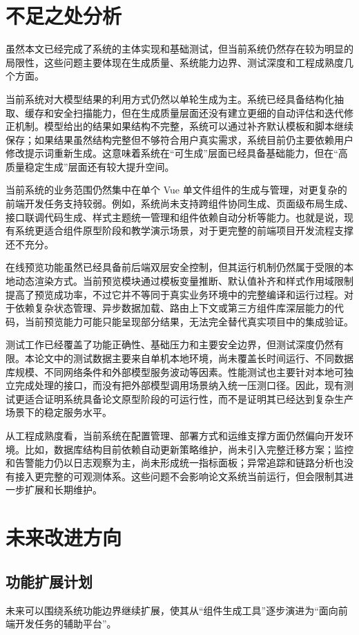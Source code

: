 \section{不足之处分析}
虽然本文已经完成了系统的主体实现和基础测试，但当前系统仍然存在较为明显的局限性，这些问题主要体现在生成质量、系统能力边界、测试深度和工程成熟度几个方面。

当前系统对大模型结果的利用方式仍然以单轮生成为主。系统已经具备结构化抽取、缓存和安全扫描能力，但在生成质量层面还没有建立更细的自动评估和迭代修正机制。模型给出的结果如果结构不完整，系统可以通过补齐默认模板和脚本继续保存；如果结果虽然结构完整但不够符合用户真实需求，系统目前仍主要依赖用户修改提示词重新生成。这意味着系统在“可生成”层面已经具备基础能力，但在“高质量稳定生成”层面还有较大提升空间。

当前系统的业务范围仍然集中在单个 Vue 单文件组件的生成与管理，对更复杂的前端开发任务支持较弱。例如，系统尚未支持跨组件协同生成、页面级布局生成、接口联调代码生成、样式主题统一管理和组件依赖自动分析等能力。也就是说，现有系统更适合组件原型阶段和教学演示场景，对于更完整的前端项目开发流程支撑还不充分。

在线预览功能虽然已经具备前后端双层安全控制，但其运行机制仍然属于受限的本地动态渲染方式。当前预览模块通过模板变量推断、默认值补齐和样式作用域限制提高了预览成功率，不过它并不等同于真实业务环境中的完整编译和运行过程。对于依赖复杂状态管理、异步数据加载、路由上下文或第三方组件库深层能力的代码，当前预览能力可能只能呈现部分结果，无法完全替代真实项目中的集成验证。

测试工作已经覆盖了功能正确性、基础压力和主要安全边界，但测试深度仍然有限。本论文中的测试数据主要来自单机本地环境，尚未覆盖长时间运行、不同数据库规模、不同网络条件和外部模型服务波动等因素。性能测试也主要针对本地可独立完成处理的接口，而没有把外部模型调用场景纳入统一压测口径。因此，现有测试更适合证明系统具备论文原型阶段的可运行性，而不是证明其已经达到复杂生产场景下的稳定服务水平。

从工程成熟度看，当前系统在配置管理、部署方式和运维支撑方面仍然偏向开发环境。比如，数据库结构目前依赖自动更新策略维护，尚未引入完整迁移方案；监控和告警能力仍以日志观察为主，尚未形成统一指标面板；异常追踪和链路分析也没有接入更完整的可观测体系。这些问题不会影响论文系统当前运行，但会限制其进一步扩展和长期维护。

\section{未来改进方向}
\subsection{功能扩展计划}
未来可以围绕系统功能边界继续扩展，使其从“组件生成工具”逐步演进为“面向前端开发任务的辅助平台”。

